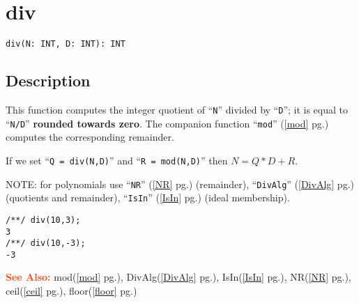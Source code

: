 \documentclass[a4paper]{mybook}
\newenvironment{command}{}{} %
\newcommand\SeeAlso{\par\textcolor{OrangeRed}{\textbf{\large See Also: }}}
\begin{document}
\section{div}
\label{div}
\begin{command} %


\begin{Verbatim}[label=syntax, rulecolor=\color{MidnightBlue},
frame=single]
div(N: INT, D: INT): INT
\end{Verbatim}


\subsection*{Description}

This function computes the integer quotient of ``\verb&N&'' divided by ``\verb&D&'';
it is equal to ``\verb&N/D&'' \textbf{rounded towards zero}.
The companion function ``\verb&mod&'' (\ref{mod} pg.\pageref{mod}) computes the corresponding remainder.
\par 
If we set ``\verb&Q = div(N,D)&'' and ``\verb&R = mod(N,D)&'' then $N = Q*D + R$.
\par 
NOTE: for polynomials use ``\verb&NR&'' (\ref{NR} pg.\pageref{NR}) (remainder),  ``\verb&DivAlg&'' (\ref{DivAlg} pg.\pageref{DivAlg}) (quotients and remainder),
``\verb&IsIn&'' (\ref{IsIn} pg.\pageref{IsIn}) (ideal membership).
\begin{Verbatim}[label=example, rulecolor=\color{PineGreen}, frame=single]
/**/ div(10,3);
3
/**/ div(10,-3);
-3
\end{Verbatim}


\SeeAlso %
  mod(\ref{mod} pg.\pageref{mod}), 
    DivAlg(\ref{DivAlg} pg.\pageref{DivAlg}), 
    IsIn(\ref{IsIn} pg.\pageref{IsIn}), 
    NR(\ref{NR} pg.\pageref{NR}), 
    ceil(\ref{ceil} pg.\pageref{ceil}), 
    floor(\ref{floor} pg.\pageref{floor})
\end{command} %
\end{document}
